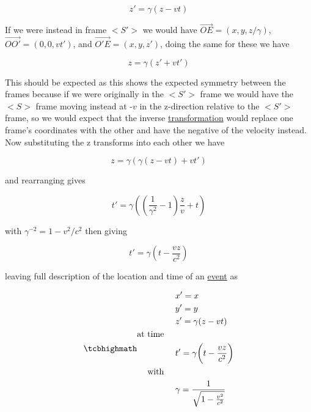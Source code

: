 \begin{equation}
	z{'} = \gamma (z-vt)
\end{equation}

If we were instead in frame $<S'>$ we would have $\overrightarrow{OE}=(x,y,z/\gamma)$, $\overrightarrow{OO'}=(0,0,vt')$, and $\overrightarrow{O'E} = (x,y,z')$, doing the same for these we have

\begin{equation}
	z = \gamma (z'+vt')
\end{equation}

This should be expected as this shows the expected symmetry between the frames because if we were originally in the $<S'>$ frame we would have the $<S>$ frame moving instead at -$v$ in the z-direction relative to the $<S'>$ frame, so we would expect that the inverse \hyperlink{def-transform}{transformation} would replace one frame's coordinates with the other and have the negative of the velocity instead.
Now substituting the z transforms into each other we have

\begin{equation}
	z = \gamma ( \gamma (z-vt)+vt')
\end{equation}

and rearranging gives

\begin{equation}
	t' = \gamma \left( \left( \dfrac{1}{\gamma^2}-1 \right)\frac{z}{v} + t \right)
\end{equation}

with $\gamma^{-2}=1-v^2/c^2$ then giving

\begin{equation}
	t' = \gamma \left( t - \dfrac{vz}{c^2} \right)
\end{equation}

leaving full description of the location and time of an \hyperlink{def-event}{event} as

\begin{equation}
	\mhl{
		\begin{aligned}
			 & x'=x                                         \\
			 & y'=y                                         \\
			 & z' = \gamma (z-vt)                           \\
			\text{at time \ \ \ }                           \\
			 & t'=\gamma \bigg(t-\frac{vz}{c^2}\bigg)       \\
			\text{with \ \ \ }                              \\
			 & \gamma = \dfrac{1}{\sqrt{1-\frac{v^2}{c^2}}}
		\end{aligned}
	}
	\label{eq: Lorentz transformation}
\end{equation}

